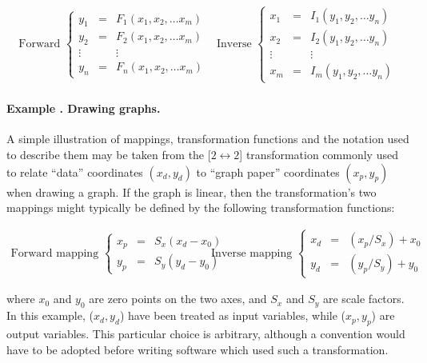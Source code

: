 \documentclass[twoside,11pt]{article}
\renewcommand{\_}{\texttt{\symbol{95}}}
\newcounter{examplecounter}
\newcommand{\example}[1]{\addtocounter{examplecounter}{1}
                         \paragraph{\textbf{Example \theexamplecounter. #1}}}
\begin{document}
\begin{equation}
\begin{array}{cc}
\mbox{Forward }
\left\{
\begin{array}{ccc}
y_1 & = & F_1(x_1, x_2,\ldots x_m)\\
y_2 & = & F_2(x_1, x_2,\ldots x_m)\\
\vdots & & \vdots\\
y_n & = & F_n(x_1, x_2,\ldots x_m)
\end{array}
\right.
&
\mbox{Inverse }
\left\{
\begin{array}{ccc}
x_1 & = & I_1(y_1, y_2,\ldots y_n)\\
x_2 & = & I_2(y_1, y_2,\ldots y_n)\\
\vdots & & \vdots\\
x_m & = & I_m(y_1, y_2,\ldots y_n)
\end{array}
\right.
\end{array}
\label{equation:transformationfunctions}
\end{equation}

\example{Drawing graphs.}
A simple illustration of mappings, transformation functions and the notation
used to describe them may be taken from the \mbox{[$2 \leftrightarrow 2$]}
transformation commonly used to relate ``data'' coordinates $(x_d,y_d)$ to
``graph paper'' coordinates $(x_p,y_p)$ when drawing a graph.
If the graph is linear, then the transformation's two mappings might
typically be defined by the following transformation functions:

\begin{equation}
\begin{array}{cc}
\mbox{Forward mapping } \left\{
\begin{array}{lll}
x_p & = & S_x(x_d-x_0) \\
y_p & = & S_y(y_d-y_0)
\end{array} \right.
&
\mbox{Inverse mapping } \left\{
\begin{array}{lll}
x_d & = & (x_p/S_x)+x_0 \\
y_d & = & (y_p/S_y)+y_0
\end{array} \right.
\end{array}
\end{equation}

where \mbox{$x_0$} and \mbox{$y_0$} are zero points on the two axes, and
\mbox{$S_x$} and \mbox{$S_y$} are scale factors.
In this example, \mbox{($x_d,y_d$)} have been treated as input variables,
while \mbox{($x_p,y_p$)} are output variables.
This particular choice is arbitrary, although a convention would have to be
adopted before writing software which used such a transformation.
\end{document}

